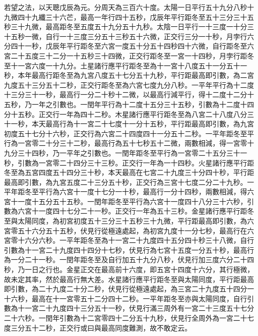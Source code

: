 \begin{pinyinscope}
若望之法，以天聰戊辰為元。分周天為三百六十度。太陽一日平行五十九分八秒十九微四十九纖三十六芒，最高一年行四十五秒，戊辰年平行距冬至五十三分三十五秒三十九微，最高距冬至五度五十九分五十九秒。太陰一日平行一十三度一十分三十五秒一微，自行一十三度三分五十三秒五十六微，正交行三分一十秒，月孛行六分四十一秒，戊辰年平行距冬至六宮一度五十分五十四秒四十六微，自行距冬至六宮二十五度三十二分一十五秒三十四微，正交行距冬至一宮一十四秒，月孛行距冬至十一宮六度一十九分。土星諸行應平行距冬至為十一宮十八度五十一分五十一秒，本年最高行距冬至為九宮八度五十七分五十九秒，平行距最高即引數，為二宮九度五十三分五十二秒，正交行距冬至為六宮七度九分八秒。一平年平行為十二度十三分三十一秒，最高行一分二十秒十二微，以最高行減平行，得十二度十二分十五秒，乃一年之引數也。一閏年平行為十二度十五分三十五秒，引數為十二度十四分十五秒。正交行一年為四十二秒。木星諸行應平行距冬至為八宮二十八度八分三十一秒，本天最高行為十一宮二十七度十一分十五秒，平行距最高即引數，為九宮初度五十七分十六秒，正交行為六宮二十四度四十一分五十二秒。一平年距冬至平行為一宮零二十分三十二秒，最高行為五十七秒五十二微，兩數相減，得一宮零十九分三十四秒，乃一平年之引數也。一閏年距冬至平行為一宮零二十五分三十一秒，引數為一宮零二十四分三十三秒。正交行一年為一十四秒。火星諸行應平行距冬至為五宮四度五十四分三十秒，本天最高在七宮二十九度三十分四十秒，平行距最高即引數，為九宮五度二十三分五十秒，正交行為三宮十七度二分二十九秒。一平年距冬至平行為六宮十一度十七分一十秒，最高行一分十四秒，兩數相減，得六宮十一度十五分五十五秒。一閏年距冬至平行為六宮十一度四十八分三十六秒，引數為六宮十一度四十七分二十一秒。正交行一年為五十三秒。金星諸行應平行距冬至與太陽同度，為初宮初度五十三分三十五秒三十九微，平行距最高即引數，為六宮零五十六分五十五秒，伏見行從極遠處起，為初宮九度十一分七秒，最高行在六宮零十六分六秒。一平年距冬至為十一宮二十九度四十五分四十秒三十八微，自行引數為十一宮二十九度四十四分十七秒，伏見行為七宮十五度一分五十秒，最高行為一分二十一秒。一閏年距冬至及自行加五十九分八秒，伏見行加三度六分二十四秒，乃一日之行也。金星正交在最高前十六度，即五宮十四度十六分，其行極微，故未定其率，然於最高行無大差。水星諸行應平行距冬至與太陽同度，平行距最高即引數，為二十九度二十分二秒，伏見行從極遠處起，為三宮二十九度五十四分一十六秒，最高在十一宮零五十二分四十二秒。一平年距冬至亦與太陽同度，自行引數為十一宮二十九度四十三分五十一秒，伏見行滿三周外有一宮二十三度五十七分二十六秒。一閏年引數為十二宮零四十二分五十九秒，伏見行全周外為一宮二十七度三分五十二秒，正交行或曰與最高同度難測，故不敢定云。


\end{pinyinscope}

